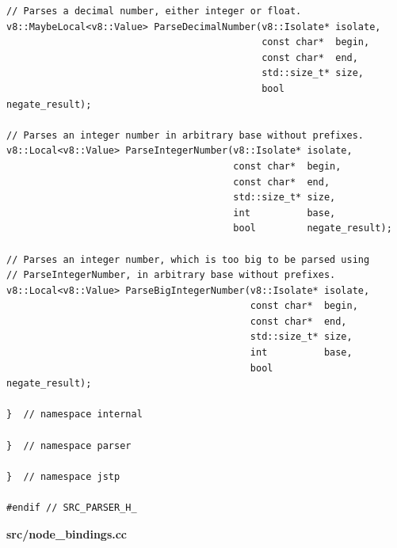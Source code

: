 \documentclass[%
  ukrainian, utf8, columnvii, simple,
  hpadding=10mm, vpadding=10mm, reduceheight=2mm,
  floatsection,
]{eskdtext}
\begin{document}
\begin{verbatim}
// Parses a decimal number, either integer or float.
v8::MaybeLocal<v8::Value> ParseDecimalNumber(v8::Isolate* isolate,
                                             const char*  begin,
                                             const char*  end,
                                             std::size_t* size,
                                             bool         negate_result);

// Parses an integer number in arbitrary base without prefixes.
v8::Local<v8::Value> ParseIntegerNumber(v8::Isolate* isolate,
                                        const char*  begin,
                                        const char*  end,
                                        std::size_t* size,
                                        int          base,
                                        bool         negate_result);

// Parses an integer number, which is too big to be parsed using
// ParseIntegerNumber, in arbitrary base without prefixes.
v8::Local<v8::Value> ParseBigIntegerNumber(v8::Isolate* isolate,
                                           const char*  begin,
                                           const char*  end,
                                           std::size_t* size,
                                           int          base,
                                           bool         negate_result);

}  // namespace internal

}  // namespace parser

}  // namespace jstp

#endif // SRC_PARSER_H_
\end{verbatim}

\textbf{src/node\_bindings.cc}
\end{document}
